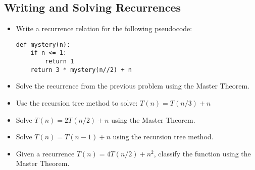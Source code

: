 \documentclass[12pt]{article}
\begin{document}
\subsection*{Writing and Solving Recurrences}
\begin{itemize}[leftmargin=1.5em]
  \item Write a recurrence relation for the following pseudocode:
\begin{lstlisting}
def mystery(n):
    if n <= 1:
        return 1
    return 3 * mystery(n//2) + n
\end{lstlisting}
  \item Solve the recurrence from the previous problem using the Master Theorem.
  \item Use the recursion tree method to solve: $T(n) = T(n/3) + n$
  \item Solve $T(n) = 2T(n/2) + n$ using the Master Theorem.
  \item Solve $T(n) = T(n-1) + n$ using the recursion tree method.
  \item Given a recurrence $T(n) = 4T(n/2) + n^2$, classify the function using the Master Theorem.
\end{itemize}
\end{document}
